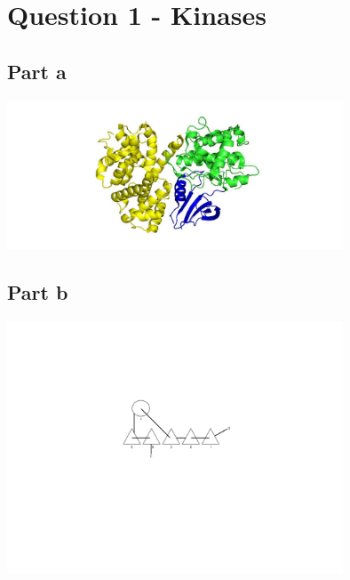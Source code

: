 \documentclass[11pt, a4paper,titlepage]{article}
\begin{document}
\setlength{\parskip}{0pt}%
\setlength{\parindent}{0pt}%
\renewcommand{\thesubsubsection}{\alph{subsubsection}.)}

\setcounter{tocdepth}{3}
\tableofcontents
\clearpage


\section{Question 1 - Kinases}
\label{sec-1}
\subsection{Part a}
\label{sec-1-1}

\includegraphics[width=10cm]{./Figures/1a.jpg}
\subsection{Part b}
\label{sec-1-2}

\includegraphics[width=10cm]{./Figures/1b.pdf}
\end{document}
